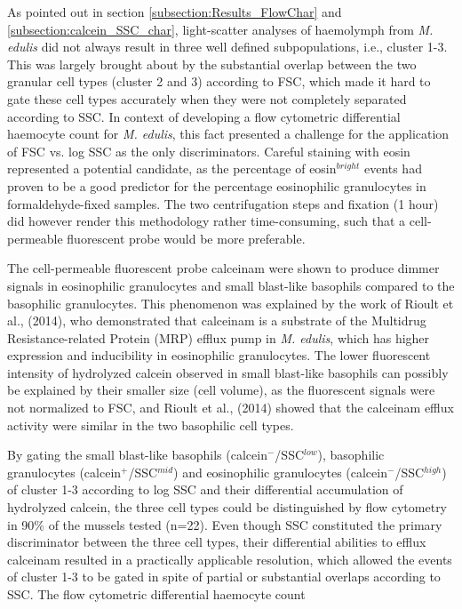 As pointed out in section \ref{subsection:Results_FlowChar} and \ref{subsection:calcein_SSC_char}, light-scatter analyses of haemolymph from \emph{M. edulis} did not always result in three well defined subpopulations, i.e., cluster 1-3. This was largely brought about by the substantial overlap between the two granular cell types (cluster 2 and 3) according to FSC, which made it hard to gate these cell types accurately when they were not completely separated according to SSC. In context of developing a flow cytometric differential haemocyte count for \emph{M. edulis}, this fact presented a challenge for the application of FSC vs. log SSC as the only discriminators. Careful staining with eosin represented a potential candidate, as the percentage of eosin$^{bright}$ events had proven to be a good predictor for the percentage eosinophilic granulocytes in formaldehyde-fixed samples. The two centrifugation steps and fixation (1 hour) did however render this methodology rather time-consuming, such that a cell-permeable fluorescent probe would be more preferable.

The cell-permeable fluorescent probe \acrshort{calceinam} were shown to produce dimmer signals in eosinophilic granulocytes and small blast-like basophils compared to the basophilic granulocytes. This phenomenon was explained by the work of Rioult et al., (2014), who demonstrated that \acrshort{calceinam} is a substrate of the Multidrug Resistance-related Protein (MRP) efflux pump in \emph{M. edulis}, which has higher expression and inducibility in eosinophilic granulocytes. The lower fluorescent intensity of hydrolyzed calcein observed in small blast-like basophils can possibly be explained by their smaller size (cell volume), as the fluorescent signals were not normalized to FSC, and Rioult et al., (2014) showed that the \acrshort{calceinam} efflux activity were similar in the two basophilic cell types.

By gating the small blast-like basophils (calcein$^{-}$/SSC$^{low}$), basophilic granulocytes (calcein$^{+}$/SSC$^{mid}$) and eosinophilic granulocytes (calcein$^{-}$/SSC$^{high}$) of cluster 1-3 according to log SSC and their differential accumulation of hydrolyzed calcein, the three cell types could be distinguished by flow cytometry in 90\% of the mussels tested (n=22). Even though SSC constituted the primary discriminator between the three cell types, their differential abilities to efflux \acrshort{calceinam} resulted in a practically applicable resolution, which allowed the events of cluster 1-3 to be gated in spite of partial or substantial overlaps according to SSC. The flow cytometric differential haemocyte count

